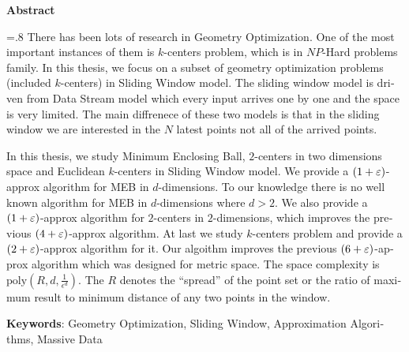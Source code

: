 


\pagestyle{empty}

\begin{latin}

\begin{center}
\textbf{Abstract}
\end{center}
\baselineskip=.8\baselineskip
There has been lots of research in Geometry Optimization. One of the most important instances of them is $k$-centers problem, which is in $NP$-Hard problems family. In this thesis, we focus on a subset of geometry optimization problems (included $k$-centers) in Sliding Window model. The sliding window model is driven from Data Stream model which every input arrives one by one and the space is very limited. The main diffrenece of these two models is that in the sliding window we are interested in the $N$ latest points not all of the arrived points.

In this thesis, we study Minimum Enclosing Ball, $2$-centers in two dimensions space and Euclidean $k$-centers in Sliding Window model. We provide a $(1+\varepsilon)$-approx algorithm  for MEB in $d$-dimensions. To our knowledge there is no well known algorithm for MEB in $d$-dimensions where $d >2 $. We also provide a $(1+\varepsilon)$-approx algorithm for $2$-centers in $2$-dimensions, which improves the previous $(4+\varepsilon)$-approx algorithm.
At last we study $k$-centers problem and provide a $(2+\varepsilon)$-approx algorithm for it. Our algoithm improves the previous $(6+\varepsilon)$-approx algorithm which was designed for metric space. The space complexity is $\text{poly}(R, d, \frac{1}{\epsilon^d})$. The $R$ denotes the
“spread” of the point set or the ratio of maximum result to minimum distance of any two points in the window.



\bigskip\noindent\textbf{Keywords}:
Geometry Optimization, Sliding Window, Approximation Algorithms, Massive Data

\end{latin}

\newpage
